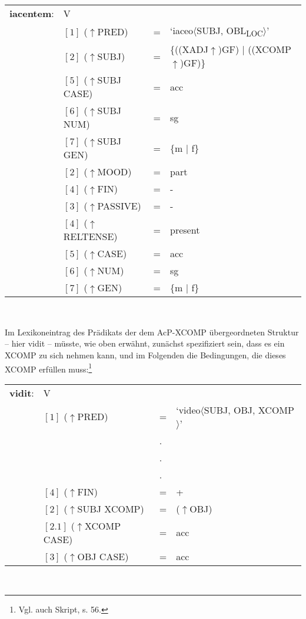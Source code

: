 \documentclass[12pt,a4paper]{article}
\begin{document}
\begin{singlespace}
\begin{tabular}{ l  l  l  l  } 
\textbf{iacentem}: & V \\ 
$\qquad$ & $[1]$ \: ($\uparrow$PRED) & = & `iaceo$\langle$SUBJ, OBL\textsubscript{LOC}$\rangle$'\\
$\qquad$ & $[2]$ \:  ($\uparrow$SUBJ) & = & \{((XADJ$\uparrow$)GF) $\mid$ ((XCOMP$\uparrow$)GF)\} \\
$\qquad$ & $[5]$ \: ($\uparrow$SUBJ CASE) & = & acc \\
$\qquad$ & $[6]$ \: ($\uparrow$SUBJ NUM) & = & sg \\
$\qquad$ & $[7]$ \: ($\uparrow$SUBJ GEN) & = & \{m $\mid$ f\} \\
$\qquad$ & $[2]$ \: ($\uparrow$MOOD) & = & part\\
$\qquad$ & $[4]$ \:  ($\uparrow$FIN) & = & - \\
$\qquad$ & $[3]$ \: ($\uparrow$PASSIVE) & = & - \\
$\qquad$ & $[4]$ \: ($\uparrow$RELTENSE) & = & present \\
$\qquad$ & $[5]$ \: ($\uparrow$CASE) & = & acc \\
$\qquad$ & $[6]$ \: ($\uparrow$NUM) & = & sg \\
$\qquad$ & $[7]$ \: ($\uparrow$GEN) & = & \{m $\mid$ f\} \\

\end{tabular}\\
\newline
\end{singlespace}
Im Lexikoneintrag des Prädikats der dem AcP-XCOMP übergeordneten Struktur -- hier vidit -- müsste, wie oben erwähnt, zunächst spezifiziert sein, dass es ein XCOMP zu sich nehmen kann, und im Folgenden die Bedingungen, die dieses XCOMP erfüllen muss:\footnote{Vgl. auch Skript, s. 56.} \\
\begin{singlespace}
\begin{tabular}{ l  l  l  l  } 
\textbf{vidit}: & V \\
$\qquad$ & $[1]$ \: ($\uparrow$PRED) & = & `video$\langle$SUBJ, OBJ, XCOMP$\rangle$'\\
$\qquad$ & $\qquad$ & . \\
$\qquad$ & $\qquad$ & . \\
$\qquad$ & $\qquad$ & . \\
$\qquad$ & $[4]$ \:  ($\uparrow$FIN) & = & + \\
$\qquad$ & $[2]$ \:  ($\uparrow$SUBJ XCOMP) & = & ($\uparrow$OBJ)\\
$\qquad$ & $[2.1]$ \: ($\uparrow$XCOMP CASE) & = & acc \\
$\qquad$ & $[3]$ \: ($\uparrow$OBJ CASE) & = & acc \\
\end{tabular}\\
\newline
\end{singlespace}
\end{document}

